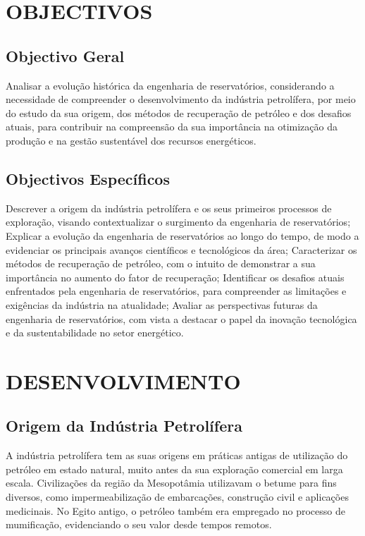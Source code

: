 \documentclass[12pt,a4paper]{report}
\begin{document}
\chapter{OBJECTIVOS}

\section{Objectivo Geral}
Analisar a evolução histórica da engenharia de reservatórios, considerando a necessidade de compreender o desenvolvimento da indústria petrolífera, por meio do estudo da sua origem, dos métodos de recuperação de petróleo e dos desafios atuais, para contribuir na compreensão da sua importância na otimização da produção e na gestão sustentável dos recursos energéticos.
\section{Objectivos Específicos}
Descrever a origem da indústria petrolífera e os seus primeiros processos de exploração, visando contextualizar o surgimento da engenharia de reservatórios;
\vspace{0,5cm}
Explicar a evolução da engenharia de reservatórios ao longo do tempo, de modo a evidenciar os principais avanços científicos e tecnológicos da área;
\vspace{0,5cm}
Caracterizar os métodos de recuperação de petróleo, com o intuito de demonstrar a sua importância no aumento do fator de recuperação;
\vspace{0,5cm}
Identificar os desafios atuais enfrentados pela engenharia de reservatórios, para compreender as limitações e exigências da indústria na atualidade;
\vspace{0,5cm}
Avaliar as perspectivas futuras da engenharia de reservatórios, com vista a destacar o papel da inovação tecnológica e da sustentabilidade no setor energético.


\chapter{DESENVOLVIMENTO}

\section{Origem da Indústria Petrolífera}

A indústria petrolífera tem as suas origens em práticas antigas de utilização do petróleo em estado natural, muito antes da sua exploração comercial em larga escala. Civilizações da região da Mesopotâmia utilizavam o betume para fins diversos, como impermeabilização de embarcações, construção civil e aplicações medicinais. No Egito antigo, o petróleo também era empregado no processo de mumificação, evidenciando o seu valor desde tempos remotos.
\end{document}
